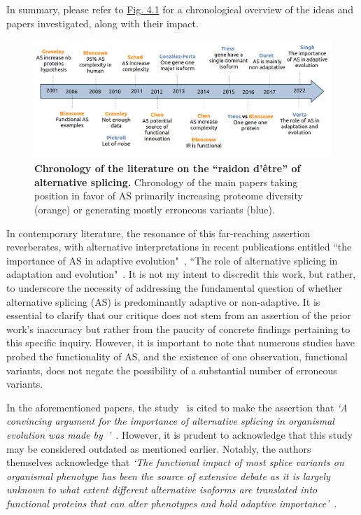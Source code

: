 In summary, please refer to \hyperref[fig:chronologyaspaper]{Fig. 4.1} for a chronological overview of the ideas and papers investigated, along with their impact.

\begin{figure}[H]
    \centering
    \includegraphics[width=\linewidth]{figures/chronology_as_paper.png}
    \caption[Chronology of the literature on the “raidon d'être” of alternative splicing]{\textbf{Chronology of the literature on the “raidon d'être” of alternative splicing.} Chronology of the main papers taking position in favor of AS primarily increasing proteome diversity (orange) or generating mostly erroneous variants (blue).}
    \label{fig:chronologyaspaper}
\end{figure}

In contemporary literature, the resonance of this far-reaching assertion reverberates, with alternative interpretations in recent publications entitled “the importance of \acrshort{AS} in adaptive evolution"~\citep{singh_importance_2022}, “The role of alternative splicing in adaptation and evolution"~\citep{verta_role_2022}. It is not my intent to discredit this work, but rather, to underscore the necessity of addressing the fundamental question of whether alternative splicing (AS) is predominantly adaptive or non-adaptive. It is essential to clarify that our critique does not stem from an assertion of the prior work's inaccuracy but rather from the paucity of concrete findings pertaining to this specific inquiry. However, it is important to note that numerous studies have probed the functionality of \acrshort{AS}, and the existence of one observation, functional variants, does not negate the possibility of a substantial number of erroneous variants.

In the aforementioned papers, the study~\citet{chen_correcting_2014} is cited to make the assertion that \textit{`A convincing argument for the importance of alternative splicing in organismal evolution was made by~\citet{chen_correcting_2014}'~\citep{singh_importance_2022}}. However, it is prudent to acknowledge that this study may be considered outdated as mentioned earlier. Notably, the authors themselves acknowledge that \textit{`The functional impact of most splice variants on organismal \gls{phenotype} has been the source of extensive debate as it is largely unknown to what extent different alternative isoforms are translated into functional proteins that can alter \gls{phenotype}s and hold adaptive importance'~\citep{singh_importance_2022}}.


